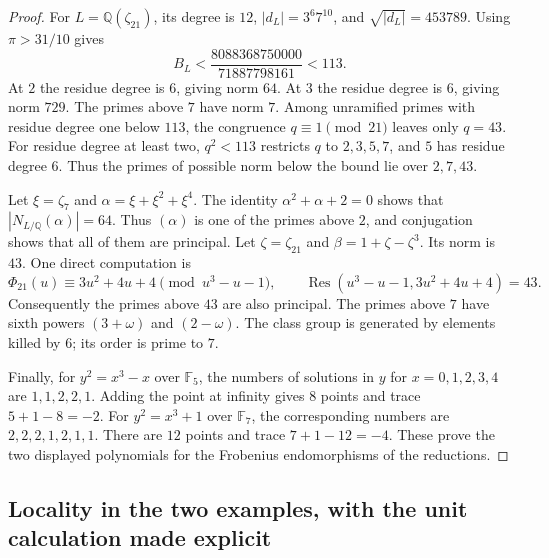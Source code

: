 \documentclass[11pt]{article}
\theoremstyle{definition}\newtheorem{definition}[theorem]{Definition}
\begin{document}
\begin{proof}
For \(L=\mathbb Q(\zeta_{21})\), its degree is \(12\),
\(|d_L|=3^6 7^{10}\), and \(\sqrt{|d_L|}=453789\).
Using \(\pi>31/10\) gives
\[
 B_L<
 \frac{8088368750000}{71887798161}<113.
\]
At \(2\) the residue degree is \(6\), giving norm \(64\).
At \(3\) the residue degree is \(6\), giving norm \(729\).
The primes above \(7\) have norm \(7\). Among unramified primes
with residue degree one below \(113\), the congruence
\(q\equiv1\pmod {21}\) leaves only \(q=43\).
For residue degree at least two, \(q^2<113\) restricts \(q\)
to \(2,3,5,7\), and \(5\) has residue degree \(6\).
Thus the primes of possible norm below the bound lie over
\(2,7,43\).

Let \(\xi=\zeta_7\) and
\(\alpha=\xi+\xi^2+\xi^4\). The identity
\(\alpha^2+\alpha+2=0\) shows that
\(|N_{L/\mathbb Q}(\alpha)|=64\).
Thus \((\alpha)\) is one of the primes above \(2\), and conjugation
shows that all of them are principal.
Let \(\zeta=\zeta_{21}\) and \(\beta=1+\zeta-\zeta^3\).
Its norm is \(43\). One direct computation is
\[
 \Phi_{21}(u)\equiv3u^2+4u+4\pmod {u^3-u-1},
 \qquad
 \operatorname{Res}(u^3-u-1,3u^2+4u+4)=43 .
\]
Consequently the primes above \(43\) are also principal.
The primes above \(7\) have sixth powers \((3+\omega)\) and
\((2-\omega)\). The class group is generated by elements killed
by \(6\); its order is prime to \(7\).

Finally, for \(y^2=x^3-x\) over \(\mathbb F_5\), the numbers of
solutions in \(y\) for \(x=0,1,2,3,4\) are
\(1,1,2,2,1\). Adding the point at infinity gives \(8\) points
and trace \(5+1-8=-2\).
For \(y^2=x^3+1\) over \(\mathbb F_7\), the corresponding numbers
are \(2,2,2,1,2,1,1\). There are \(12\) points and trace
\(7+1-12=-4\). These prove the two displayed polynomials for
the Frobenius endomorphisms of the reductions.
\end{proof}

\subsection{Locality in the two examples, with the unit calculation made explicit}
\end{document}
